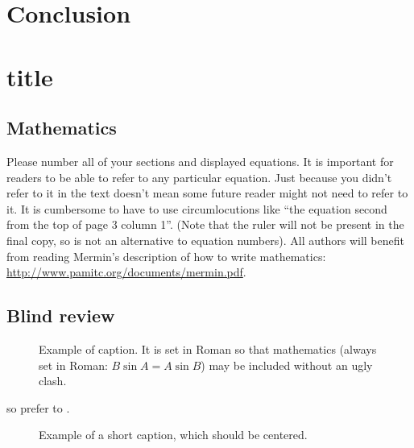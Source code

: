 \documentclass[10pt,twocolumn,letterpaper]{article}
\begin{document}
\section{Conclusion}

\section{title}




\subsection{Mathematics}

Please number all of your sections and displayed equations.  It is
important for readers to be able to refer to any particular equation.  Just
because you didn't refer to it in the text doesn't mean some future reader
might not need to refer to it.  It is cumbersome to have to use
circumlocutions like ``the equation second from the top of page 3 column
1''.  (Note that the ruler will not be present in the final copy, so is not
an alternative to equation numbers).  All authors will benefit from reading
Mermin's description of how to write mathematics:
\url{http://www.pamitc.org/documents/mermin.pdf}.


\subsection{Blind review}
\begin{figure}[t]
\begin{center}
\fbox{\rule{0pt}{2in} \rule{0.9\linewidth}{0pt}}
\end{center}
   \caption{Example of caption.  It is set in Roman so that mathematics
   (always set in Roman: $B \sin A = A \sin B$) may be included without an
   ugly clash.}
\label{fig:long}
\label{fig:onecol}
\end{figure}


so prefer \cite{Alpher03,Alpher02,Authors14} to
\cite{Alpher02,Alpher03,Authors14}.


\begin{figure*}
\begin{center}
\fbox{\rule{0pt}{2in} \rule{.9\linewidth}{0pt}}
\end{center}
   \caption{Example of a short caption, which should be centered.}
\label{fig:short}
\end{figure*}
\end{document}

